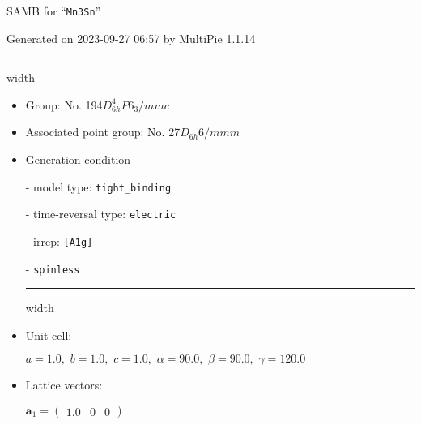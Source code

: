 \documentclass[fleqn,10pt,landscape]{article}
\begin{document}
\setcounter{MaxMatrixCols}{16}

\setlength{\baselineskip}{16pt}
\footnotesize
\begin{center}
\LARGE
SAMB for ``\texttt{Mn3Sn}''
\end{center}
\begin{flushright}
Generated on 2023-09-27 06:57 by MultiPie 1.1.14
\end{flushright}
\vspace{1cm}


 \hfil \hrule height 1mm width \textwidth \hfil

\begin{itemize}
\item Group: No. 194\quad$D_{6h}^{4}$\quad$P6_3/mmc$\quad[ hexagonal ]

\item Associated point group: No. 27\quad$D_{6h}$\quad$6/mmm$\quad[ hexagonal ]

\vspace{5mm}

\item Generation condition

\quad - model type: \texttt{tight_binding}

\quad - time-reversal type: \texttt{electric}

\quad - irrep: \texttt{[A1g]}

\quad - \texttt{spinless}


 \hfil \hrule height 1mm width \textwidth \hfil

\item Unit cell:

\quad $a=1.0,\,\, b=1.0,\,\, c=1.0,\,\, \alpha=90.0,\,\, \beta=90.0,\,\, \gamma=120.0$

\item Lattice vectors:

\quad $\bm{a}_1=\begin{pmatrix} 1.0 & 0 & 0 \end{pmatrix}$


\end{itemize}
\end{document}
